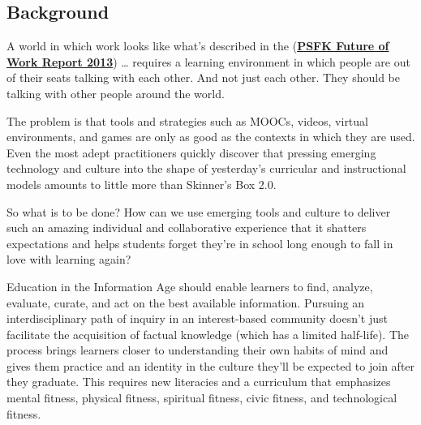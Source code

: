\subsection{Background}

A world in which work looks like what's described in the
(\textbf{\href{http://www.slideshare.net/PSFK/psfk-presents-future-of-work-report}{PSFK
    Future of Work Report 2013}}) \ldots{} requires a learning
environment in which people are out of their seats talking with each other.
And not just each other.  They should be talking with other people around the world.




The problem is that tools and strategies such as MOOCs, videos,
virtual environments, and games are only as good as the contexts in
which they are used.  Even the most adept practitioners quickly
discover that pressing emerging technology and culture into the shape
of yesterday's curricular and instructional models amounts to little
more than Skinner's Box 2.0.

So what is to be done? How can we use emerging tools and culture to
deliver such an amazing individual and collaborative experience that it
shatters expectations and helps students forget they're in school long
enough to fall in love with learning again?


Education in the Information Age should enable learners to find,
analyze, evaluate, curate, and act on the best available information.
Pursuing an interdisciplinary path of inquiry in an interest-based
community doesn't just facilitate the acquisition of factual knowledge
(which has a limited half-life). The process brings learners closer to
understanding their own habits of mind and gives them practice and an
identity in the culture they'll be expected to join after they graduate.
This requires new literacies and a curriculum that emphasizes mental
fitness, physical fitness, spiritual fitness, civic fitness, and
technological fitness.

